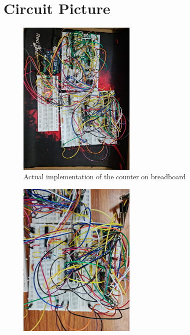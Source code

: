 \documentclass[a4paper,12pt]{article}
\begin{document}
\section*{Circuit Picture}
\begin{figure}[H]
  \centering
  \includegraphics[width=0.5\textwidth]{circuit_picture.jpeg} %
  \caption{Actual implementation of the counter on breadboard}
\end{figure}
\begin{figure}[H]
  \centering
  \includegraphics[width=0.5\textwidth]{circuit_picture_2.jpeg} %
\end{figure}
\end{document}
